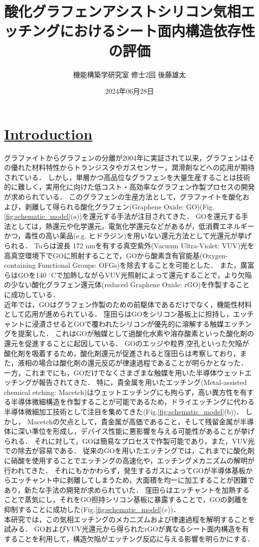 \documentclass[platex,dvipdfmx]{jlreq}			%
\title{酸化グラフェンアシストシリコン気相エッチングにおけるシート面内構造依存性の評価}
\author{機能構築学研究室 修士2回 後藤雄太}
\date{2024年06月28日}
\begin{document}
\maketitle

\section*{\ul{Introduction}}
グラファイトからグラフェンの分離が2004年に実証されて以来，グラフェンはその優れた材料特性からトランジスタやガスセンサー，潤滑剤などへの応用が期待されている．
しかし，単層かつ高品位なグラフェンを大量生産することは技術的に難しく，実用化に向けた低コスト・高効率なグラフェン作製プロセスの開発が求められている．
このグラフェンの生産方法として，グラファイトを酸化および，剥離して得られる酸化グラフェン(Graphene Oxide: GO)(Fig.\ref{fig:schematic_model}(a))を還元する手法が注目されてきた．
GOを還元する手法としては，熱還元や化学還元，電気化学還元などがあるが，低消費エネルギーかつ，毒性の高い薬品(e.g. ヒドラジン)を用いない還元方法として光還元が挙げられる．
Tuらは波長 172 nmを有する真空紫外(Vacuum Ultra-Violet: VUV)光を高真空環境下でGOに照射することで，GOから酸素含有官能基(Oxygen-containing Functional Groups: OFGs)を除去することを可能とした．
また，廣富らはGOを140 ${}^\circ$Cで加熱しながらVUV光照射によって還元することで，より欠陥の少ない酸化グラフェン還元体(reduced Graphene Oxide: rGO)を作製することに成功している．\\
\indent
近年では，GOはグラフェン作製のための前駆体であるだけでなく，機能性材料として応用が進められている．
窪田らはGOをシリコン基板上に担持し，エッチャントに浸漬させるとGOで覆われたシリコンが優先的に溶解する触媒エッチングを提案した．
これはGOが触媒として過酸化水素や溶存酸素といった酸化剤の還元を促進することに起因している．
GOのエッジや粒界,空孔といった欠陥が酸化剤を吸着するため，酸化剤還元が促進されると窪田らは考察しており，また，液相の場合は酸化剤の還元反応が律速過程であることが明らかとなった．
一方，これまでにも，GOだけでなくさまざまな触媒を用いた半導体ウェットエッチングが報告されてきた．
特に，貴金属を用いたエッチング(Metal-assisted chemical etching: Macetch)はウェットエッチングにも拘らず，高い異方性を有する半導体微細構造を作製することが可能であるため，ドライエッチングに代わる半導体微細加工技術として注目を集めてきた(Fig.\ref{fig:schematic_model}(b))．
しかし， Macetchの欠点として，貴金属が高価であること，そして残留金属が半導体に深い準位を形成し，デバイス性能に悪影響を与える可能性があることが挙げられる．
それに対して，GOは簡易なプロセスで作製可能であり，また，VUV光での除去が容易である．
従来のGOを用いたエッチングでは，これまでに酸化剤に硝酸を使用することでエッチングの高速化や，エッチングメカニズムの解明が行われてきた．
それにもかかわらず，発生するガスによってGOが半導体基板からエッチャント中に剥離してしまうため，大面積を均一に加工することが困難であり，新たな手法の開発が求められていた．
窪田らはエッチャントを加熱することで蒸気にし，それをGO担持シリコン基板に暴露することで，GOの剥離を抑制することに成功した(Fig.\ref{fig:schematic_model}(c))．\\
\indent
本研究では，この気相エッチングのメカニズムおよび律速過程を解明することを試みる．
GOおよびVUV光還元から得られたrGOが異なるシート面内構造を有することを利用して，構造欠陥がエッチング反応に与える影響を明らかにする．
\end{document}
